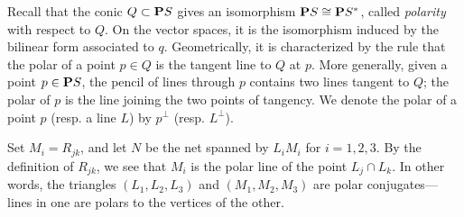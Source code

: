 \documentclass[11pt,reqno]{amsart}
\theoremstyle{plain}
\theoremstyle{definition}
\theoremstyle{remark}
\numberwithin{equation}{section}
\numberwithin{equation}{section}
\begin{document}
Recall that the conic $Q \subset \P S$ gives an isomorphism $\P S \cong \P S^*$, called \emph{polarity} with respect to $Q$.
On the vector spaces, it is the isomorphism induced by the bilinear form associated to $q$.
Geometrically, it is characterized by the rule that the polar of a point $p \in Q$ is the tangent line to $Q$ at $p$.
More generally, given a point $p \in \P S$, the pencil of lines through $p$ contains two lines tangent to $Q$; the polar of $p$ is the line joining the two points of tangency.
We denote the polar of a point $p$ (resp. a line $L$) by $p^\perp$ (resp. $L^\perp$).

Set $M_i = R_{jk}$, and let $N$ be the net spanned by $L_iM_i$ for $i = 1, 2, 3$.
By the definition of $R_{jk}$, we see that $M_i$ is the polar line of the point $L_j \cap L_k$.
In other words, the triangles $(L_1, L_2, L_3)$ and $(M_1, M_2, M_3)$ are polar conjugates---lines in one are polars to the vertices of the other.
\end{document}
